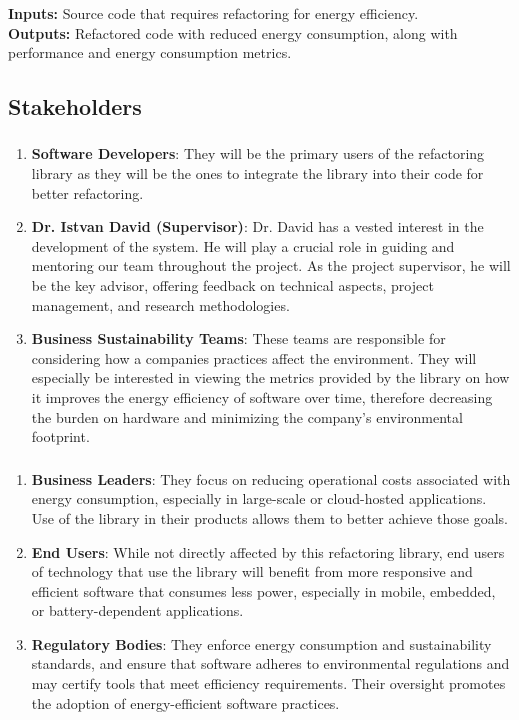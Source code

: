 \documentclass{article}
\begin{document}
\textbf{Inputs:} Source code that requires refactoring for energy efficiency. \\
\textbf{Outputs:} Refactored code with reduced energy consumption, along with performance and energy consumption metrics.

\subsection{Stakeholders}
\subsubsection*{\color{blue}{Direct Stakeholders}}
\begin{enumerate}

    \item \textbf{Software Developers}: They will be the primary users of the refactoring library as they will be the ones to integrate the library into their code for better refactoring.
    \item \textbf{Dr. Istvan David (Supervisor)}: Dr. David has a vested interest in the development of the system. He will play a crucial role in guiding and mentoring our team throughout the project. As the project supervisor, he will be the key advisor, offering feedback on technical aspects, project management, and research methodologies. 
    \item \textbf{Business Sustainability Teams}: These teams are responsible for considering how a companies practices affect the environment. They will especially be interested in viewing the metrics provided by the library on how it improves the energy efficiency of software over time, therefore decreasing the burden on hardware and minimizing the company's environmental footprint.

\end{enumerate}

\subsubsection*{\color{blue}{Indirect Stakeholders}}
\begin{enumerate}

    \item \textbf{Business Leaders}: They focus on reducing operational costs associated with energy consumption, especially in large-scale or cloud-hosted applications. Use of the library in their products allows them to better achieve those goals. 
    \item \textbf{End Users}: While not directly affected by this refactoring library, end users of technology that use the library will benefit from more responsive and efficient software that consumes less power, especially in mobile, embedded, or battery-dependent applications. 
    \item \textbf{Regulatory Bodies}: They enforce energy consumption and sustainability standards, and ensure that software adheres to environmental regulations and may certify tools that meet efficiency requirements. Their oversight promotes the adoption of energy-efficient software practices.

\end{enumerate}
\end{document}
